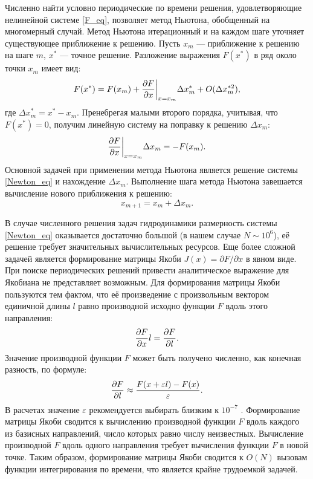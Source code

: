 Численно найти условно периодические по времени решения, удовлетворяющие нелинейной системе \eqref{F_eq}, позволяет метод Ньютона, обобщенный на многомерный случай. Метод Ньютона итерационный и на каждом шаге уточняет существующее приближение к решению. Пусть $x_m$ --- приближение к решению на шаге $m$, $x^*$ --- точное решение. Разложение выражения $F(x^*)$ в ряд около точки $x_m$ имеет вид:
\begin{equation}
F(x^*) = F(x_m) + \frac{\partial F}{\partial x}\bigg|_{x=x_m} \Delta x_m^* + O(\Delta x_m^{*2}), 
\end{equation}
где $\Delta x_m^* = x^* - x_m$. Пренебрегая малыми второго порядка, учитывая, что $F(x^*) = 0$, получим линейную систему на поправку к решению $\Delta x_m$:
\begin{equation}\label{Newton_eq}
\frac{\partial F}{\partial x}\bigg|_{x = x_m} \Delta x_m = - F(x_m). 
\end{equation}
Основной задачей при применении метода Ньютона является решение системы \eqref{Newton_eq} и нахождение $\Delta x_m$. Выполнение шага метода Ньютона завешается вычисление нового приближения к решению: 
\begin{equation} \label{end_NK_eq}
x_{m+1} = x_m + \Delta x_m. 
\end{equation}

В случае численного решения задач гидродинамики размерность системы \eqref{Newton_eq} оказывается достаточно большой (в нашем случае $N \sim 10^6$), её решение требует значительных вычислительных ресурсов. Еще более сложной задачей является формирование матрицы Якоби $J(x) = \partial F / \partial x $ в явном виде. При поиске периодических решений привести аналитическое выражение для Якобиана не представляет возможным. Для формирования матрицы Якоби пользуются тем фактом, что её произведение с произвольным вектором единичной длины $l$ равно производной исходно функции $F$ вдоль этого направления:
\begin{equation} \label{Jl_eq}
\frac{\partial F}{\partial x} l = \frac{\partial F}{\partial l}. 
\end{equation}
Значение производной функции $F$ может быть получено численно, как конечная разность, по формуле:
\begin{equation}\label{fd_eq}
\frac{\partial F}{\partial l} \approx \frac{F(x + \varepsilon l) - F(x)}{\varepsilon}.
\end{equation}
В расчетах значение $\varepsilon$ рекомендуется выбирать близким к $10^{-7}$ \cite{Viswanath2007}. Формирование матрицы Якоби сводится к вычислению производной функции $F$ вдоль каждого из базисных направлений, число которых равно числу неизвестных. Вычисление производной $F$ вдоль одного направления требует вычисления функции $F$ в новой точке. Таким образом, формирование матрицы Якоби сводится к $O(N)$ вызовам функции интегрирования по времени, что является крайне трудоемкой задачей. 


